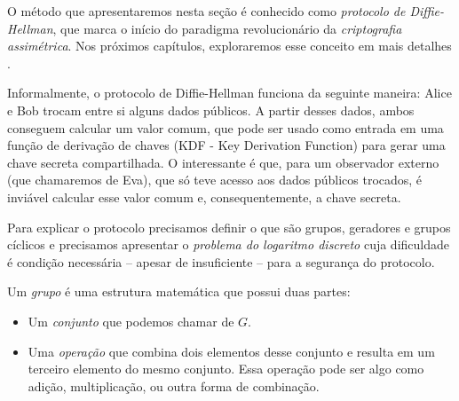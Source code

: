 O método que apresentaremos nesta seção é conhecido como {\em protocolo de Diffie-Hellman}, que marca o início do paradigma revolucionário da {\em criptografia assimétrica}.
Nos próximos capítulos, exploraremos esse conceito em mais detalhes \cite{Diffie76}.

Informalmente, o protocolo de Diffie-Hellman funciona da seguinte maneira:
Alice e Bob trocam entre si alguns dados públicos.
A partir desses dados, ambos conseguem calcular um valor comum, que pode ser usado como entrada em uma função de derivação de chaves (KDF - Key Derivation Function) para gerar uma chave secreta compartilhada.
O interessante é que, para um observador externo (que chamaremos de Eva), que só teve acesso aos dados públicos trocados, é inviável calcular esse valor comum e, consequentemente, a chave secreta.

Para explicar o protocolo precisamos definir o que são grupos, geradores e grupos cíclicos e precisamos apresentar o {\em problema do logaritmo discreto} cuja dificuldade é condição necessária -- apesar de insuficiente -- para a segurança do protocolo.

Um {\em grupo} é uma estrutura matemática que possui duas partes:
\begin{itemize}
\item Um {\em conjunto} que podemos chamar de $G$.
\item Uma {\em operação} que combina dois elementos desse conjunto e resulta em um terceiro elemento do mesmo conjunto.
  Essa operação pode ser algo como adição, multiplicação, ou outra forma de combinação.
  \end{itemize}

